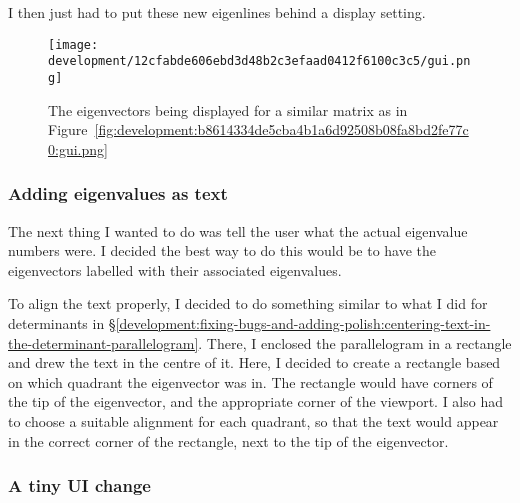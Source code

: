 \documentclass[../development.tex]{subfiles}
\begin{document}

I then just had to put these new eigenlines behind a display setting.




\begin{figure}[H]
	\centering
	\texttt{[image: development/12cfabde606ebd3d48b2c3efaad0412f6100c3c5/gui.png]}
	\caption{The eigenvectors being displayed for a similar matrix as in Figure~\ref{fig:development:b8614334de5cba4b1a6d92508b08fa8bd2fe77c0:gui.png}}
	\label{fig:development:12cfabde606ebd3d48b2c3efaad0412f6100c3c5:gui.png}
\end{figure}

\subsubsection{Adding eigenvalues as text\label{development:implementing-eigenstuffs:adding-eigenvalues-as-text}}

The next thing I wanted to do was tell the user what the actual eigenvalue numbers were. I decided the best way to do this would be to have the eigenvectors labelled with their associated eigenvalues.

To align the text properly, I decided to do something similar to what I did for determinants in \S\ref{development:fixing-bugs-and-adding-polish:centering-text-in-the-determinant-parallelogram}. There, I enclosed the parallelogram in a rectangle and drew the text in the centre of it. Here, I decided to create a rectangle based on which quadrant the eigenvector was in. The rectangle would have corners of the tip of the eigenvector, and the appropriate corner of the viewport. I also had to choose a suitable alignment for each quadrant, so that the text would appear in the correct corner of the rectangle, next to the tip of the eigenvector.


\subsubsection{A tiny UI change\label{development:implementing-eigenstuffs:a-tiny-ui-change}}
\end{document}
